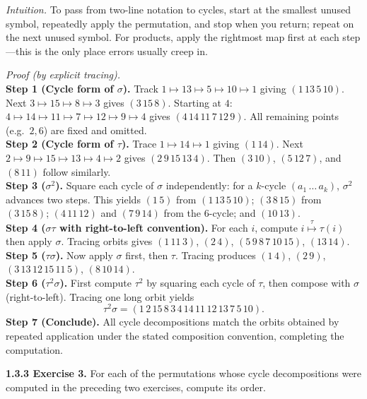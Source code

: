 \documentclass[12pt]{article}
\theoremstyle{definition}
\begin{document}
\newpage

\dotfill

\emph{Intuition.} To pass from two-line notation to cycles, start at the smallest unused symbol, repeatedly apply the permutation, and stop when you return; repeat on the next unused symbol. For products, apply the rightmost map first at each step—this is the only place errors usually creep in.\\

\dotfill

\emph{Proof (by explicit tracing).}\\
\textbf{Step 1 (Cycle form of $\sigma$).} Track $1\mapsto13\mapsto5\mapsto10\mapsto1$ giving $(1\,13\,5\,10)$. Next $3\mapsto15\mapsto8\mapsto3$ gives $(3\,15\,8)$. Starting at $4$: $4\mapsto14\mapsto11\mapsto7\mapsto12\mapsto9\mapsto4$ gives $(4\,14\,11\,7\,12\,9)$. All remaining points (e.g.\ $2,6$) are fixed and omitted.\\
\textbf{Step 2 (Cycle form of $\tau$).} Trace $1\mapsto14\mapsto1$ giving $(1\,14)$. Next $2\mapsto9\mapsto15\mapsto13\mapsto4\mapsto2$ gives $(2\,9\,15\,13\,4)$. Then $(3\,10)$, $(5\,12\,7)$, and $(8\,11)$ follow similarly.\\
\textbf{Step 3 ($\sigma^2$).} Square each cycle of $\sigma$ independently: for a $k$-cycle $(a_1\,\dots\,a_k)$, $\sigma^2$ advances two steps. This yields
$(1\,5)$ from $(1\,13\,5\,10)$; $(3\,8\,15)$ from $(3\,15\,8)$; $(4\,11\,12)$ and $(7\,9\,14)$ from the $6$-cycle; and $(10\,13)$.\\
\textbf{Step 4 ($\sigma\tau$ with right-to-left convention).} For each $i$, compute $i\stackrel{\tau}{\longmapsto}\tau(i)$ then apply $\sigma$. Tracing orbits gives
$(1\,11\,3)$, $(2\,4)$, $(5\,9\,8\,7\,10\,15)$, $(13\,14)$.\\
\textbf{Step 5 ($\tau\sigma$).} Now apply $\sigma$ first, then $\tau$. Tracing produces
$(1\,4)$, $(2\,9)$, $(3\,13\,12\,15\,11\,5)$, $(8\,10\,14)$.\\
\textbf{Step 6 ($\tau^{2}\sigma$).} First compute $\tau^2$ by squaring each cycle of $\tau$, then compose with $\sigma$ (right-to-left). Tracing one long orbit yields
\[
\tau^{2}\sigma=(1\,2\,15\,8\,3\,4\,14\,11\,12\,13\,7\,5\,10).
\]
\textbf{Step 7 (Conclude).} All cycle decompositions match the orbits obtained by repeated application under the stated composition convention, completing the computation.

\newpage

\noindent \textbf{1.3.3 Exercise 3.} For each of the permutations whose cycle decompositions were computed in the preceding two exercises, compute its order.\\ %
\end{document}
